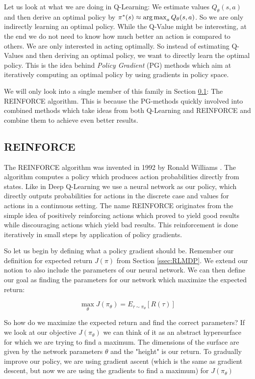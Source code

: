 Let us look at what we are doing in Q-Learning: We estimate values $Q_\theta(s, a)$ and then derive an optimal policy by $\pi^*(s) \approx \operatorname*{arg\,max}_a Q_\theta(s, a)$. So we are only indirectly learning an optimal policy. While the Q-Value might be interesting, at the end we do not need to know how much better an action is compared to others. We are only interested in acting optimally. So instead of estimating Q-Values and then deriving an optimal policy, we want to directly learn the optimal policy. This is the idea behind \textit{Policy Gradient} (PG) methods which aim at iteratively computing an optimal policy by using gradients in policy space.

We will only look into a single member of this family in Section \ref{ssec:REINFORCE}: The REINFORCE algorithm. This is because the PG-methods quickly involved into combined methods which take ideas from both Q-Learning and REINFORCE and combine them to achieve even better results.

\subsection{REINFORCE} \label{ssec:REINFORCE}
The REINFORCE algorithm was invented in 1992 by Ronald Williams \cite{williams1992simple}. The algorithm computes a policy which produces action probabilities directly from states. Like in Deep Q-Learning we use a neural network as our policy, which directly outputs probabilities for actions in the discrete case and values for actions in a continuous setting. The name REINFORCE originates from the simple idea of positively reinforcing actions which proved to yield good results while discouraging actions which yield bad results. This reinforcement is done iteratively in small steps by application of policy gradients.

So let us begin by defining what a policy gradient should be. Remember our definition for expected return $J(\pi)$ from Section \ref{ssec:RLMDP}. We extend our notion to also include the parameters of our neural network. We can then define our goal as finding the parameters for our network which maximize the expected return:  

\begin{equation} \label{eq:PGObjective}
  \max_\theta J(\pi_\theta) =  E_{\tau\sim\pi_\theta}\left[R(\tau) \right]
\end{equation}

So how do we maximize the expected return and find the correct parameters? If we look at our objective $J(\pi_\theta)$ we can think of it as an abstract hypersurface for which we are trying to find a maximum. The dimensions of the surface are given by the network parameters $\theta$ and the "height" is our return. To gradually improve our policy, we are using gradient ascent (which is the same as gradient descent, but now we are using the gradients to find a maximum) for $J(\pi_\theta)$


